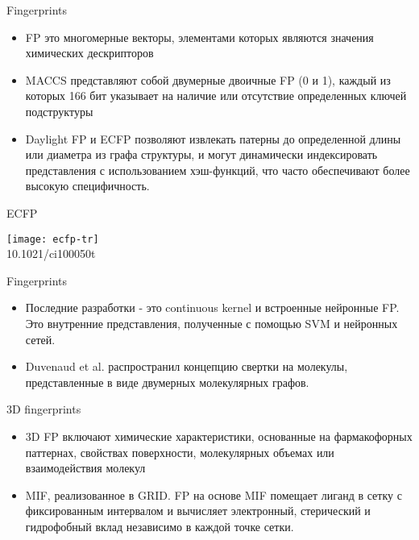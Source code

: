 \begin{frame}{Fingerprints}
    \begin{itemize}
        \item FP это многомерные векторы, элементами которых являются значения химических дескрипторов 
        \item MACCS представляют собой двумерные двоичные FP (0 и 1), каждый из которых 166 бит указывает на наличие или отсутствие определенных ключей подструктуры
        \item Daylight FP и ECFP  позволяют извлекать патерны до определенной длины или диаметра из графа структуры, и  могут динамически
            индексировать представления с использованием хэш-функций, что  часто обеспечивают более высокую специфичность.
        \end{itemize}
\end{frame}


\begin{frame}{ECFP}
    \begin{center}
        \texttt{[image: ecfp-tr]}\\

        \footnotesize 10.1021/ci100050t
    \end{center}
\end{frame}

\begin{frame}{Fingerprints}
    \begin{itemize}
        \item  Последние разработки - это continuous kernel  и встроенные нейронные FP. Это внутренние представления, полученные с помощью SVM и нейронных сетей.
        \item Duvenaud et al. распространил концепцию свертки на молекулы, представленные в виде двумерных молекулярных графов. 
        \end{itemize}
\end{frame}

\begin{frame}{3D fingerprints}
    \begin{itemize}
        \item 3D FP  включают химические характеристики, основанные на фармакофорных паттернах, свойствах поверхности, молекулярных объемах или взаимодействия молекул 
        \item MIF, реализованное в GRID. FP на основе MIF помещает лиганд в сетку с фиксированным интервалом и вычисляет электронный, стерический и гидрофобный вклад независимо в каждой точке сетки.
    \end{itemize}
\end{frame}


